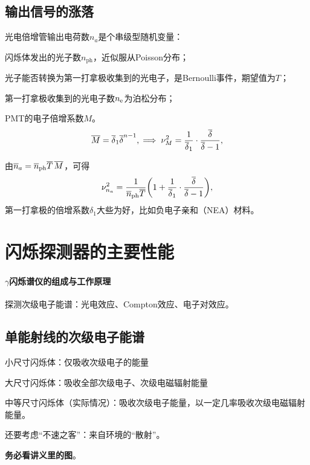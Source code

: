 \subsection{输出信号的涨落}

光电倍增管输出电荷数$n_a$是个串级型随机变量：
\begin{compactitem}
	\item 闪烁体发出的光子数$n_{\mathrm{ph}}$，近似服从Poisson分布；
	\item 光子能否转换为第一打拿极收集到的光电子，是Bernoulli事件，期望值为$T$；
	\item 第一打拿极收集到的光电子数$n_\mathrm e$为泊松分布；
	\item PMT的电子倍增系数$M$。
	\[
		\overline{M}=\overline{\delta}_1\overline{\delta}^{n-1},\implies\nu_M^2=\frac1{\overline{\delta}_1}\cdot\frac{\overline{\delta}}{\overline{\delta}-1},
	\]
\end{compactitem}
由$\overline{n}_a=\overline{n}_{\mathrm{ph}}\overline{T}\,\overline{M}$，可得 
\begin{align}
	\nu_{n_a}^2=\frac1{\overline{n}_{\mathrm{ph}}\overline{T}}\biggl(1+\frac1{\overline{\delta}_1}\cdot\frac{\overline{\delta}}{\overline{\delta}-1}\biggr),
\end{align}
第一打拿极的倍增系数$\delta_1$大些为好，比如负电子亲和（NEA）材料。

\section{闪烁探测器的主要性能}

\paragraph{$\gamma$闪烁谱仪的组成与工作原理}
探测次级电子能谱：光电效应、Compton效应、电子对效应。

\subsection{单能\textgamma 射线的次级电子能谱}

\begin{compactitem}
	\item 小尺寸闪烁体：仅吸收次级电子的能量
	\item 大尺寸闪烁体：吸收全部次级电子、次级电磁辐射能量
	\item 中等尺寸闪烁体（实际情况）：吸收次级电子能量，以一定几率吸收次级电磁辐射能量。
\end{compactitem}
还要考虑“不速之客”：来自环境的“散射”。

\textbf{务必看讲义里的图}。

